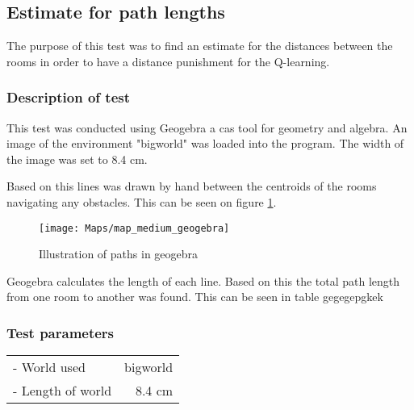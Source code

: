 \documentclass[../Head/Main.tex]{subfiles}
\begin{document}
\subsection{Estimate for path lengths}
\label{subsec:est_path_length}
The purpose of this test was to find an estimate for the distances between the rooms in order to have a distance punishment for the Q-learning.
\subsubsection*{Description of test}
This test was conducted using Geogebra a cas tool for geometry and algebra. An image of the environment "bigworld" was loaded into the program. The width of the image was set to 8.4 cm.\par 
Based on this lines was drawn by hand between the centroids of the rooms navigating any obstacles. This can be seen on figure \ref{fig:geogebra}.
\begin{figure}[H]
	\centering
	\texttt{[image: Maps/map\_medium\_geogebra]}
	\caption{Illustration of paths in geogebra}
	\label{fig:geogebra}
\end{figure}
Geogebra calculates the length of each line. Based on this the total path length from one room to another was found. This can be seen in table gegegepgkek
\subsubsection*{Test parameters}
\begin{tabular}{l r}
	- World used                & bigworld\\	
	- Length of world           & 8.4 cm\\
\end{tabular}
\end{document}
